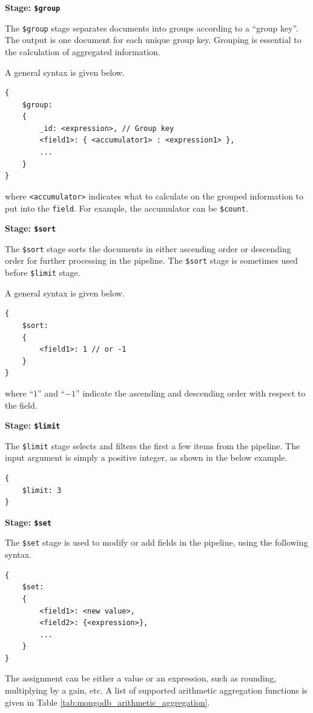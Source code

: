 \vspace{0.1in}
\noindent \textbf{Stage: \texttt{\$group}}
\vspace{0.1in}

The \verb|$group| stage separates documents into groups according to a ``group key''. The output is one document for each unique group key. Grouping is essential to the calculation of aggregated information.

A general syntax is given below.
\begin{lstlisting}
{
	$group:
	{
		_id: <expression>, // Group key
		<field1>: { <accumulator1> : <expression1> },
		...
	}
}
\end{lstlisting}
where \verb|<accumulator>| indicates what to calculate on the grouped information to put into the \verb|field|. For example, the accumulator can be \verb|$count|.

\vspace{0.1in}
\noindent \textbf{Stage: \texttt{\$sort}}
\vspace{0.1in}

The \verb|$sort| stage sorts the documents in either ascending order or descending order for further processing in the pipeline. The \verb|$sort| stage is sometimes used before \verb|$limit| stage.

A general syntax is given below.
\begin{lstlisting}
{
	$sort:
	{
		<field1>: 1 // or -1
	}
}
\end{lstlisting}
where ``$1$'' and ``$-1$'' indicate the ascending and descending order with respect to the field.

\vspace{0.1in}
\noindent \textbf{Stage: \texttt{\$limit}}
\vspace{0.1in}

The \verb|$limit| stage selects and filters the first a few items from the pipeline. The input argument is simply a positive integer, as shown in the below example.
\begin{lstlisting}
{
	$limit: 3
}
\end{lstlisting}

\vspace{0.1in}
\noindent \textbf{Stage: \texttt{\$set}}
\vspace{0.1in}

The \verb|$set| stage is used to modify or add fields in the pipeline, using the following syntax.
\begin{lstlisting}
{
	$set:
	{
		<field1>: <new value>,
		<field2>: {<expression>},
		...
	}
}
\end{lstlisting}
The assignment can be either a value or an expression, such as rounding, multiplying by a gain, etc. A list of supported arithmetic aggregation functions is given in Table \ref{tab:mongodb_arithmetic_aggregation}.

